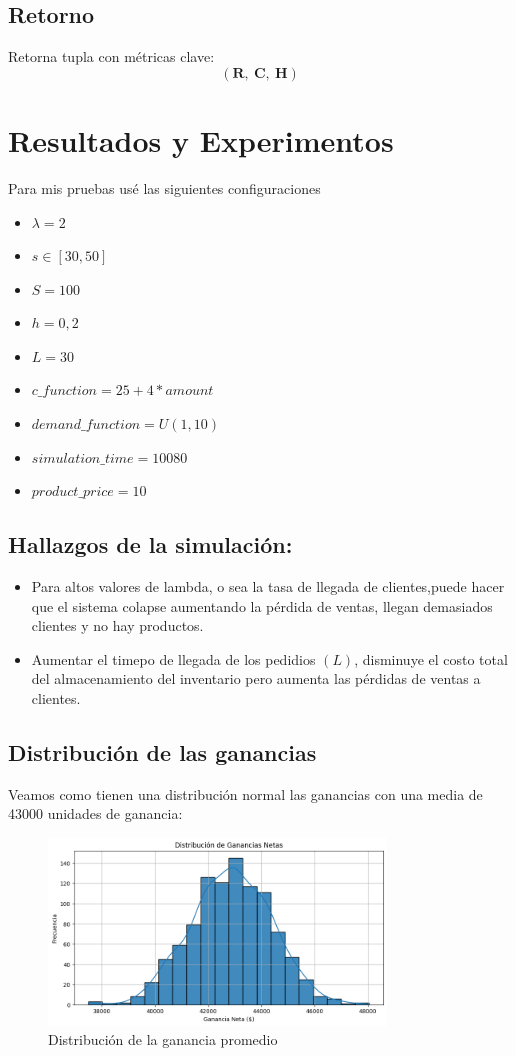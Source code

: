 \documentclass{article}
\begin{document}
\subsection*{Retorno}
Retorna tupla con métricas clave:
\[
(\mathbf{R},\ \mathbf{C},\ \mathbf{H})
\]

\section{Resultados y Experimentos}
Para mis pruebas usé las siguientes configuraciones
    \begin{itemize}
        \item $\lambda = 2$
        \item $s \in [30 , 50]$
        \item $S = 100$
        \item $h = 0,2$
        \item $L = 30 $
        \item $c\_function = 25 + 4 * amount$
        \item $demand\_function = U(1,10)$
        \item $simulation\_time = 10080$
        \item $product\_price = 10$
    \end{itemize}
\subsection{Hallazgos de la simulación:}
    \begin{itemize}
    \item Para altos valores de lambda, o sea la tasa de llegada de clientes,puede hacer que el sistema colapse aumentando la pérdida de ventas, llegan demasiados clientes y no hay productos.
    \item Aumentar el timepo de llegada de los pedidios  $(L)$, disminuye el costo total del almacenamiento del inventario pero aumenta las pérdidas de ventas a clientes.
    \end{itemize}

\subsection{Distribución de las ganancias}
Veamos como tienen una distribución normal las ganancias con una media de 43000 unidades de ganancia:

\begin{figure}[h]
    \centering
    \includegraphics[width=0.8\textwidth]{images/distribution.png}
    \caption{Distribución de la ganancia promedio}
\end{figure}
\end{document}
